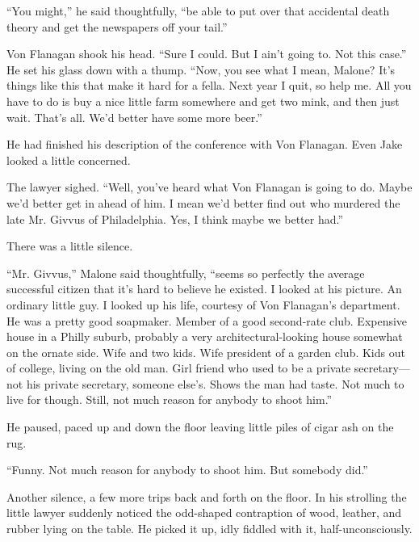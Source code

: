 \documentclass{novel}
\begin{document}
“You might,” he said thoughtfully, “be able to put over that accidental death theory and get the newspapers off your tail.”

Von Flanagan shook his head. “Sure I could. But I ain’t going to. Not this case.” He set his glass down with a thump. “Now, you see what I mean, Malone? It’s things like this that make it hard for a fella. Next year I quit, so help me. All you have to do is buy a nice little farm somewhere and get two mink, and then just wait. That’s all. We’d better have some more beer.”

\begin{ChapterStart}
\vspace{3\nbs}
\end{ChapterStart}

He had finished his description of the conference with Von Flanagan. Even Jake looked a little concerned.

The lawyer sighed. “Well, you’ve heard what Von Flanagan is going to do. Maybe we’d better get in ahead of him. I mean we’d better find out who murdered the late Mr. Givvus of Philadelphia. Yes, I think maybe we better had.”

There was a little silence.

“Mr. Givvus,” Malone said thoughtfully, “seems so perfectly the average successful citizen that it’s hard to believe he existed. I looked at his picture. An ordinary little guy. I looked up his life, courtesy of Von Flanagan’s department. He was a pretty good soapmaker. Member of a good second-rate club. Expensive house in a Philly suburb, probably a very architectural-looking house somewhat on the ornate side. Wife and two kids. Wife president of a garden club. Kids out of college, living on the old man. Girl friend who used to be a private secretary—not his private secretary, someone else’s. Shows the man had taste. Not much to live for though. Still, not much reason for anybody to shoot him.”

He paused, paced up and down the floor leaving little piles of cigar ash on the rug.

“Funny. Not much reason for anybody to shoot him. But somebody did.”

Another silence, a few more trips back and forth on the floor. In his strolling the little lawyer suddenly noticed the odd-shaped contraption of wood, leather, and rubber lying on the table. He picked it up, idly fiddled with it, half-unconsciously.
\end{document}
